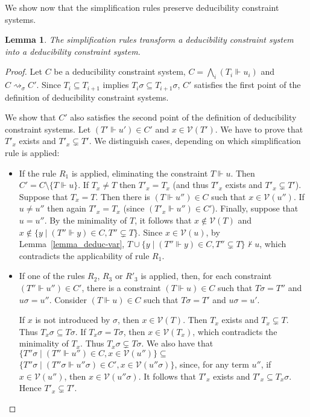 \documentclass[acmtocl,acmnow]{acmtrans2m}
\newtheorem{lemma}[theorem]{Lemma}
\newcommand{\var}{\mathcal{V}}
\newcommand{\set}[1]{\lbrace{#1}\rbrace}
\newcommand{\simpl}{\rightsquigarrow}   \newcommand{\msimpl}{\rightsquigarrow}  \newcommand{\gsimpl}{\leadsto}
\newcommand{\dedsys}[1]{deducibility constraint system}
\newcommand{\dedsyss}[1]{deducibility constraint systems}
\begin{document}
We show now that the simplification rules preserve \dedsyss{}.
\begin{lemma}\label{lemma_c2c}
The simplification rules transform a \dedsys{} into a \dedsys{}.
\end{lemma}
\begin{proof}
Let $C$ be a \dedsys{}, $C=\bigwedge_i (T_i\Vdash
u_i)$ and $C\simpl_\sigma C'$. Since $T_i\subseteq T_{i+1}$
implies $T_i\sigma\subseteq T_{i+1}\sigma$,  $C'$
satisfies the first point of the definition of \dedsyss{}.





We show that $C'$ also satisfies the second point of the definition
of \dedsyss{}. Let $(T'\Vdash u')\in C'$ and $x\in\var(T')$. We have
to prove that $T'_x$ exists and $T'_x\subsetneq T'$. We distinguish cases,
depending on
which simplification rule is applied:

\begin{itemize}
\item 
If the rule $R_1$ is applied, eliminating the constraint
$T\Vdash u$. Then $C'=C\setminus\set{T\Vdash u}$. If $T_x\neq T$ then
$T'_x=T_x$ (and thus $T'_x$ exists and $T'_x\subsetneq T'$). Suppose
that $T_x=T$. Then there is $(T\Vdash u'')\in C$ such that
$x\in\var(u'')$. If $u\neq u''$ then again $T'_x=T_x$ (since
$(T'_x\Vdash u'')\in C'$).  Finally, suppose that $u=u''$. By the
minimality of $T$, it follows that $x\notin\var(T)$ and $x\notin\{y\mid
(T''\Vdash y)\in C, T''\subsetneq T\}$.  Since $x\in\var(u)$, by Lemma~\ref{lemma_deduc-var},
 $T\cup \{y\mid (T''\Vdash y) \in C, T''\subsetneq T\}\not\vdash
u$, which contradicts the applicability of rule $R_1$.

\item If one of the rules $R_2$, $R_3$ or $R'_3$ is applied, then,
 for each constraint $(T''\Vdash u'')\in C'$,
there is a constraint $(T\Vdash u)\in C$ such that $T\sigma=T''$ and $u\sigma=u''$.
Consider $(T\Vdash u)\in C$ such that $T\sigma=T'$ and $u\sigma=u'$.

If $x$ is not introduced by $\sigma$, then $x\in \var(T)$. 
Then $T_x$ exists and $T_x\subsetneq T$. Thus
$T_x\sigma\subseteq T\sigma$. If $T_x\sigma= T\sigma$, then $x\in\var(T_x)$, 
which contradicts the minimality
of $T_x$. Thus $T_x\sigma\subsetneq T\sigma$. We also have that 
$\set{T''\sigma\mid (T''\Vdash u'')\in C,
x\in\var(u'')} \subseteq$ $\{T''\sigma\mid (T''\sigma\Vdash u''\sigma)\in C', x\in\var(u''\sigma)\}$, since,
 for any term $u''$, if $x\in \var(u'')$, then $x\in \var(u''\sigma)$. It follows that $T'_x$ exists and
$T'_x\subseteq T_x\sigma$. Hence $T'_x\subsetneq T'$.




\end{itemize}
\end{proof}
\end{document}
